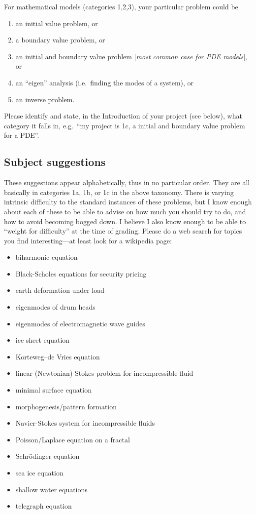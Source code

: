 \documentclass[11pt]{amsart}
\begin{document}
For mathematical models (categories 1,2,3), your particular problem could be
\renewcommand{\labelenumi}{\alph{enumi}.}
\begin{enumerate}
\item an initial value problem, or
\item a boundary value problem, or
\item an initial and boundary value problem [\emph{most common case for PDE models}], or
\item an ``eigen'' analysis (i.e.~finding the modes of a system), or
\item an inverse problem.
\end{enumerate}
Please identify and state, in the Introduction of your project (see below), what category it falls in, e.g.~``my project is 1c, a initial and boundary value problem for a PDE''.

\subsection*{Subject suggestions}  These suggestions appear alphabetically, thus in no particular order.  They are all basically in categories 1a, 1b, or 1c in the above taxonomy.  There is varying intrinsic difficulty to the standard instances of these problems, but I know enough about each of these to be able to advise on how much you should try to do, and how to avoid becoming bogged down.  I believe I also know enough to be able to ``weight for difficulty'' at the time of grading.  Please do a web search for topics you find interesting---at least look for a wikipedia page:
\begin{itemize}
\item biharmonic equation
\item Black-Scholes equations for security pricing
\item earth deformation under load
\item eigenmodes of drum heads
\item eigenmodes of electromagnetic wave guides
\item ice sheet equation
\item Korteweg--de Vries equation
\item linear (Newtonian) Stokes problem for incompressible fluid
\item minimal surface equation
\item morphogenesis/pattern formation
\item Navier-Stokes system for incompressible fluids
\item Poisson/Laplace equation on a fractal
\item Schr\"odinger equation
\item sea ice equation
\item shallow water equations
\item telegraph equation
\end{itemize}
\end{document}
